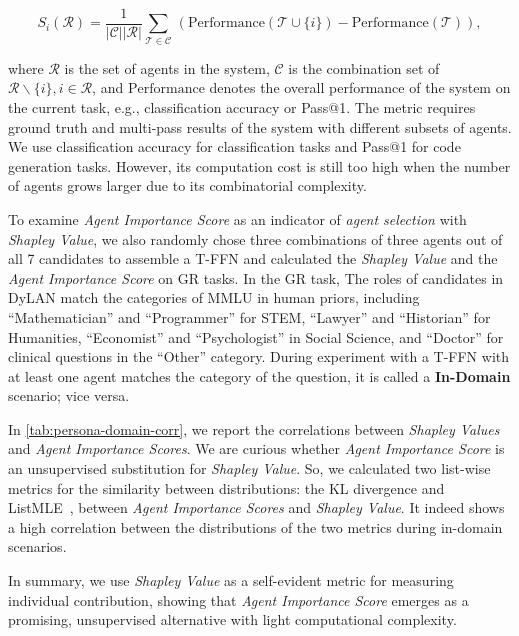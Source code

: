 \documentclass{article} %
\begin{document}
\begin{equation}
    S_i(\mathcal{R}) = \frac{1}{|\mathcal{C}||\mathcal{R}|} \sum_{\mathcal{T} \in \mathcal{C}} \frac{}{} (\mathrm{Performance}(\mathcal{T} \cup \{i\}) - \mathrm{Performance}(\mathcal{T})),
\end{equation}


where $\mathcal{R}$ is the set of agents in the system, $\mathcal{C}$ is the combination set of $\mathcal{R}\backslash\{i\}, i\in \mathcal{R}$, and $\mathrm{Performance}$ denotes the overall performance of the system on the current task, e.g., classification accuracy or Pass@1. The metric requires ground truth and multi-pass results of the system with different subsets of agents. We use classification accuracy for classification tasks and Pass@1 for code generation tasks. However, its computation cost is still too high when the number of agents grows larger due to its combinatorial complexity. 

To examine \textit{Agent Importance Score} as an indicator of \textit{agent selection} with \textit{Shapley Value}, we also randomly chose three combinations of three agents out of all 7 candidates to assemble a T-FFN and calculated the \textit{Shapley Value} and the \textit{Agent Importance Score} on GR tasks.
In the GR task, The roles of candidates in DyLAN match the categories of MMLU in human priors, including ``Mathematician'' and ``Programmer'' for STEM, ``Lawyer'' and ``Historian'' for Humanities, ``Economist'' and ``Psychologist'' in Social Science, and ``Doctor'' for clinical questions in the ``Other'' category. During experiment with a T-FFN with at least one agent matches the category of the question, it is called a \textbf{In-Domain} scenario; vice versa.

In \cref{tab:persona-domain-corr}, we report the correlations between \textit{Shapley Values} and \textit{Agent Importance Scores}. We are curious whether \textit{Agent Importance Score} is an unsupervised substitution for \textit{Shapley Value}. So, we calculated two list-wise metrics for the similarity between distributions: the KL divergence and ListMLE~\citep{listmle}, between \textit{Agent Importance Scores} and \textit{Shapley Value}. It indeed shows a high correlation between the distributions of the two metrics during in-domain scenarios.

In summary, we use \textit{Shapley Value} as a self-evident metric for measuring individual contribution, showing that \textit{Agent Importance Score} emerges as a promising, unsupervised alternative with light computational complexity.
\end{document}
